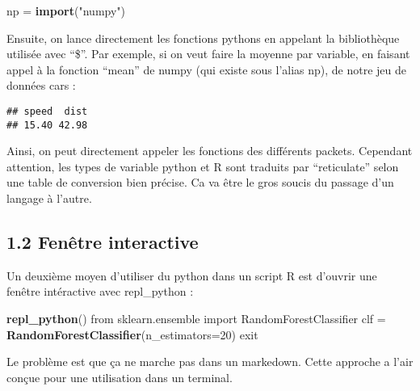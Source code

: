 \documentclass[]{article}
\newenvironment{Shaded}{\begin{snugshade}}{\end{snugshade}}
\newcommand{\DataTypeTok}[1]{\textcolor[rgb]{0.13,0.29,0.53}{#1}}
\newcommand{\DecValTok}[1]{\textcolor[rgb]{0.00,0.00,0.81}{#1}}
\newcommand{\KeywordTok}[1]{\textcolor[rgb]{0.13,0.29,0.53}{\textbf{#1}}}
\newcommand{\NormalTok}[1]{#1}
\newcommand{\OperatorTok}[1]{\textcolor[rgb]{0.81,0.36,0.00}{\textbf{#1}}}
\newcommand{\StringTok}[1]{\textcolor[rgb]{0.31,0.60,0.02}{#1}}
\begin{document}
\begin{Shaded}
\begin{Highlighting}[]
\NormalTok{np  =}\StringTok{ }\KeywordTok{import}\NormalTok{(}\StringTok{"numpy"}\NormalTok{)}
\end{Highlighting}
\end{Shaded}

Ensuite, on lance directement les fonctions pythons en appelant la
bibliothèque utilisée avec ``\$''. Par exemple, si on veut faire la
moyenne par variable, en faisant appel à la fonction ``mean'' de numpy
(qui existe sous l'alias np), de notre jeu de données cars :

\begin{Shaded}
\end{Shaded}

\begin{verbatim}
## speed  dist 
## 15.40 42.98
\end{verbatim}

Ainsi, on peut directement appeler les fonctions des différents packets.
Cependant attention, les types de variable python et R sont traduits par
``reticulate'' selon une table de conversion bien précise. Ca va être le
gros soucis du passage d'un langage à l'autre.

\hypertarget{fenetre-interactive}{%
\subsection{1.2 Fenêtre interactive}\label{fenetre-interactive}}

Un deuxième moyen d'utiliser du python dans un script R est d'ouvrir une
fenêtre intéractive avec repl\_python :

\begin{Shaded}
\begin{Highlighting}[]
\KeywordTok{repl\_python}\NormalTok{()}
\NormalTok{from sklearn.ensemble import RandomForestClassifier}
\NormalTok{clf =}\StringTok{ }\KeywordTok{RandomForestClassifier}\NormalTok{(}\DataTypeTok{n\_estimators=}\DecValTok{20}\NormalTok{)}
\NormalTok{exit}
\end{Highlighting}
\end{Shaded}

Le problème est que ça ne marche pas dans un markedown. Cette approche a
l'air conçue pour une utilisation dans un terminal.
\end{document}
